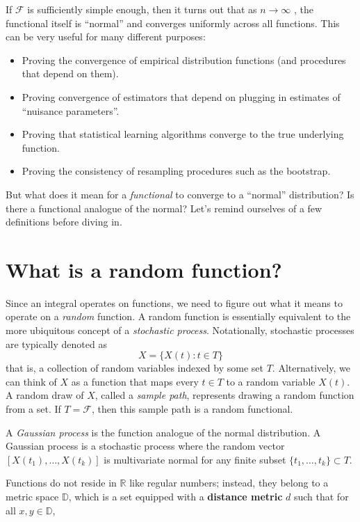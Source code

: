\documentclass[
]{article}
\begin{document}
If \(\mathcal{F}\) is sufficiently simple enough, then it turns out that
as \(n\rightarrow \infty\) , the functional itself is ``normal'' and
converges uniformly across all functions. This can be very useful for
many different purposes: 
\begin{itemize}
\item Proving the convergence of empirical
distribution functions (and procedures that depend on them). 
\item Proving
convergence of estimators that depend on plugging in estimates of
``nuisance parameters''. 
\item Proving that statistical learning algorithms
converge to the true underlying function. 
\item Proving the consistency of
resampling procedures such as the bootstrap.
\end{itemize}

But what does it mean for a \emph{functional} to converge to a
``normal'' distribution? Is there a functional analogue of the normal?
Let's remind ourselves of a few definitions before diving in.

\section{What is a random function?}\label{what-is-a-random-function}

Since an integral operates on functions, we need to figure out what it
means to operate on a \emph{random} function. A random function is
essentially equivalent to the more ubiquitous concept of a
\emph{stochastic process}. Notationally, stochastic processes are
typically denoted as \[X = \{X(t) : t \in T\}\] that is, a collection of
random variables indexed by some set \(T\). Alternatively, we can think
of \(X\) as a function that maps every \(t \in T\) to a random variable
\(X(t)\). A random draw of \(X\), called a \emph{sample path},
represents drawing a random function from a set. If \(T = \mathcal{F}\),
then this sample path is a random functional.

A \emph{Gaussian process} is the function analogue of the normal
distribution. A Gaussian process is a stochastic process where the
random vector \([X(t_1),\ldots,X(t_k)]\) is multivariate normal for any
finite subset \(\{t_1,\ldots, t_k\} \subset T\).

Functions do not reside in \(\mathbb{R}\) like regular numbers; instead,
they belong to a metric space \(\mathbb{D}\), which is a set equipped
with a \textbf{distance metric} \(d\) such that for all
\(x, y \in \mathbb{D}\), 
\end{document}

